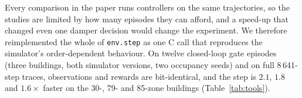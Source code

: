 \providecommand{\pending}[1]{\textcolor{red}{[pending: #1]}}
\providecommand{\e}[1]{\times10^{-#1}}

Every comparison in the paper runs controllers on the same trajectories, so the studies are
limited by how many episodes they can afford, and a speed-up that changed even one damper
decision would change the experiment. We therefore reimplemented the whole of \texttt{env.step}
as one C call that reproduces the simulator's order-dependent behaviour. On twelve closed-loop
gate episodes (three buildings, both simulator versions, two occupancy seeds) and on full
8\,641-step traces, observations and rewards are bit-identical, and the step is $2.1$, $1.8$ and
$1.6\times$ faster on the 30-, 79- and 85-zone buildings (Table~\ref{tab:tools}).

